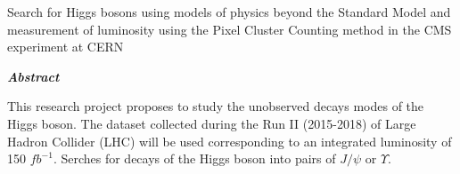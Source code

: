 \documentclass[final,3p]{CSP}
\def\ProjectTitleEnglish{Search for Higgs bosons using models of physics beyond the Standard Model and measurement of luminosity using the Pixel Cluster Counting method in the CMS experiment at CERN}
\begin{document}
\shipout\null


\newpage
\hspace{2pt}
\vfill

\begin{adjustwidth}{1cm}{1cm}

  \begin{center}
    {\Large \ProjectTitleEnglish \par}
    \vspace{1cm}
    {\itshape\textbf{Abstract}\par}
  \end{center}
  
  \vspace{1 cm}
 

\onehalfspacing This research project proposes to study the unobserved decays modes of the Higgs boson. The dataset collected during the Run II (2015-2018) of Large Hadron Collider (LHC) will be used corresponding to an integrated luminosity of 150 $fb^{-1}$. Serches for decays of the Higgs boson into pairs of $J/\psi$ or $\Upsilon$.




\end{adjustwidth}
\end{document}
